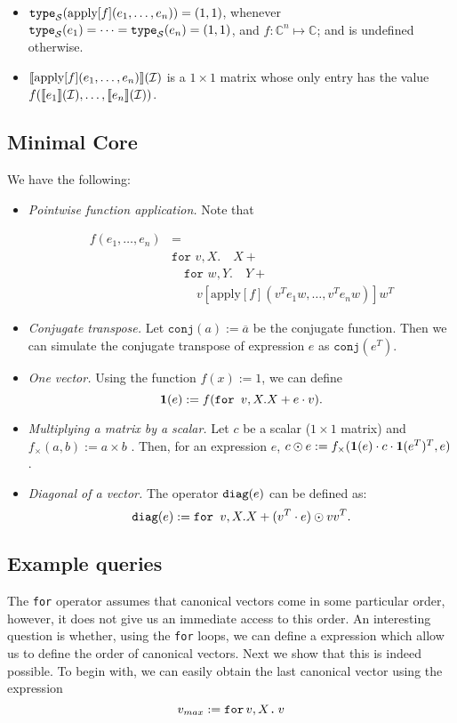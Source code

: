 \begin{itemize}
\item $\texttt{type}_{\mathcal{S}}(\text{apply}[f](e_1,\ldots ,e_n)) = (1,1)$, whenever $\texttt{type}_{\mathcal{S}}(e_1)= \cdots =\texttt{type}_{\mathcal{S}}(e_n)=(1,1)$, and $f:\mathbb{C}^n\mapsto \mathbb{C}$; and is undefined otherwise.
\item $\llbracket \text{apply}[f](e_1,\ldots ,e_n) \rrbracket(\mathcal{I})$ is a $1\times 1$ matrix whose only entry has the value $f(\llbracket e_1 \rrbracket(\mathcal{I}),\ldots ,\llbracket e_n \rrbracket(\mathcal{I}))$.
\end{itemize}

\subsection{Minimal Core}
We have the following:

\begin{itemize}
\item {\em Pointwise function application.} Note that

\begin{align*}
f(e_1,\ldots, e_n)&=\\ 
&\texttt{for }v,X.\quad X + \\
&\quad \texttt{for }w,Y.\quad Y + \\ 
&\quad \quad v\left[ \text{apply}[f](v^Te_1w, \ldots, v^Te_nw) \right] w^T 
\end{align*}

\item {\em Conjugate transpose.} Let $\texttt{conj}(a) := \overline{a}$ be the conjugate function. Then we can simulate the conjugate transpose of expression $e$ as $\texttt{conj}(e^T)$.
\item {\em One vector.} Using the function $f(x) := 1$, we can define $$\mathbf{1}(e) := f(\texttt{for } v,X. X + e\cdot v).$$
\item {\em Multiplying a matrix by a scalar.} Let $c$ be a scalar ($1\times 1$ matrix) and $f_{\times}(a, b) := a \times b$ . Then, for an expression $e$, $c\odot e := f_{\times}(\mathbf{1}(e)\cdot c \cdot \mathbf{1}(e^T)^T, e)$.
\item {\em Diagonal of a vector.} The operator $\texttt{diag}(e)$ can be defined as:
$$\texttt{diag}(e) := \texttt{for } v, X. X + (v^T\cdot e) \odot vv^T.$$
\end{itemize}

\subsection{Example queries}

 The \texttt{for} operator assumes that canonical vectors come in some particular order, however, it does not give us an immediate access to this order. An interesting question is whether, using the \texttt{for} loops, we can define a \langfor expression which allow us to define the order of canonical vectors. Next we show that this is indeed possible. To begin with, we can easily obtain the last canonical vector using the expression $$v_{max} := \texttt{for}\, v,X \texttt{.}\, v$$

